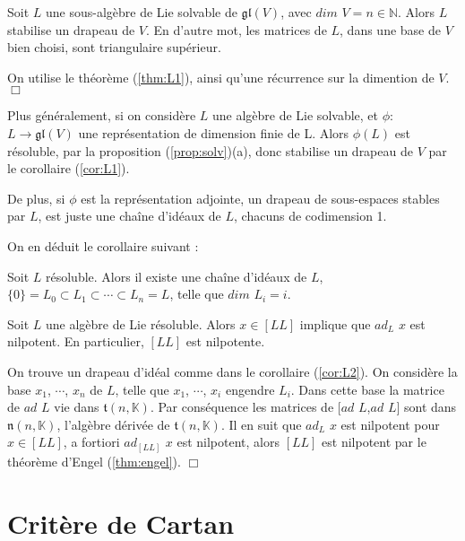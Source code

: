 \documentclass[a4paper,openany,12pt]{report}
\newcommand{\KK}{\mathbb{K}}
\newcommand{\NN}{\mathbb{N}}
\newcommand{\gl}{\mathfrak{gl}}
\newcommand{\ttt}{\mathfrak{t}}
\newcommand{\nn}{\mathfrak{n}}
\theoremstyle{break}
{\theorembodyfont{\upshape}
\newtheorem*{rmq}{Remarque :}
\newtheorem*{prv}{Preuve :}
\newtheorem*{ex}{Exemples :}
\newtheorem{exe}{Exemple : }
\newtheorem*{nota}{Notation :}}
\begin{document}
\begin{cor}\label{cor:L1}
\quad Soit $L$ une sous-algèbre de Lie solvable de $\gl(V)$, avec $dim$ $V = n \in \NN$. Alors $L$ stabilise un drapeau de $V$.
En d'autre mot, les matrices de $L$, dans une base de $V$ bien choisi, sont triangulaire supérieur.
\end{cor}

\begin{prv}
\quad On utilise le théorème (\ref{thm:L1}), ainsi qu'une récurrence sur la dimention de $V$. $\Box$
\end{prv}

\quad Plus généralement, si on considère $L$ une algèbre de Lie solvable, et $\phi$: $L \to \gl(V)$ une représentation de dimension finie de L. Alors $\phi(L)$ est résoluble, par la proposition (\ref{prop:solv})(a), donc stabilise un drapeau de $V$ par le corollaire (\ref{cor:L1}).

\quad De plus, si $\phi$ est la représentation adjointe, un drapeau de sous-espaces stables par $L$, est juste une chaîne d'idéaux de $L$, chacuns de codimension 1.

On en déduit le corollaire suivant :

\begin{cor}\label{cor:L2}
\quad Soit $L$ résoluble. 
Alors il existe une chaîne d'idéaux de $L$, $\{0\}=L_{0} \subset L_{1} \subset \cdots \subset L_{n} = L$, telle que $dim$ $L_{i}=i$.
\end{cor}

\begin{cor}\label{cor:L3}
\quad Soit $L$ une algèbre de Lie résoluble. Alors $x \in [LL]$ implique que $ad_{L}$ $x$ est nilpotent.
En particulier, $[LL]$ est nilpotente.
\end{cor}

\begin{prv}
\quad On trouve un drapeau d'idéal comme dans le corollaire (\ref{cor:L2}). On considère la base $x_{1}$, $\cdots$, $x_{n}$ de $L$, telle que $x_{1}$, $\cdots$, $x_{i}$ engendre $L_{i}$. Dans cette base la matrice de $ad$ $L$ vie dans $\ttt(n,\KK)$. Par conséquence les matrices de $[ad$ $L$,$ad$ $L]$ sont dans $\nn(n,\KK)$, l'algèbre dérivée de $\ttt(n,\KK)$. Il en suit que $ad_{L}$ $x$ est nilpotent pour $x \in [LL]$, a fortiori $ad_{[LL]}$ $x$ est nilpotent, alors $[LL]$ est nilpotent par le théorème d'Engel (\ref{thm:engel}). $\Box$
\end{prv}

\chapter{Critère de Cartan}
\end{document}
